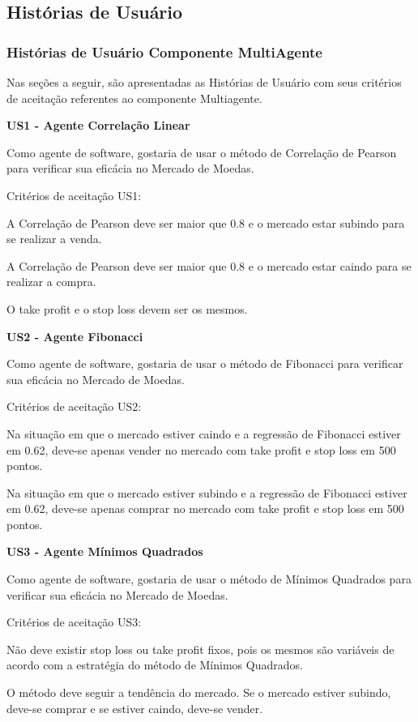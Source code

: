 \subsection{Histórias de Usuário}

\subsubsection{Histórias de Usuário Componente MultiAgente}
Nas seções a seguir, são apresentadas as Histórias de Usuário com seus critérios de aceitação referentes ao componente Multiagente.

\textbf{ US1 - Agente Correlação Linear}

Como agente de software, gostaria de usar o método de Correlação de Pearson para verificar sua eficácia no Mercado de Moedas.

Critérios de aceitação US1:

A Correlação de Pearson deve ser maior que 0.8 e o mercado estar subindo para se realizar a venda.

A Correlação de Pearson deve ser maior que 0.8 e o mercado estar caindo para se realizar a compra.

O take profit e o stop loss devem ser os mesmos.

\textbf{US2 - Agente Fibonacci}

Como agente de software, gostaria de usar o método de Fibonacci para verificar sua eficácia no Mercado de Moedas.

Critérios de aceitação US2:

Na situação em que o mercado estiver caindo e a regressão de Fibonacci estiver em 0.62, deve-se apenas vender no mercado com take profit e stop loss em 500 pontos.

Na situação em que o mercado estiver subindo e a regressão de Fibonacci estiver em 0.62, deve-se apenas comprar no mercado com take profit e stop loss em 500 pontos.

\textbf{US3 - Agente Mínimos Quadrados}

Como agente de software, gostaria de usar o método de Mínimos Quadrados para verificar sua eficácia no Mercado de Moedas.

Critérios de aceitação US3:

Não deve existir stop loss ou take profit fixos, pois os mesmos são variáveis de acordo com a estratégia do método de Mínimos Quadrados.

O método deve seguir a tendência do mercado. Se o mercado estiver subindo, deve-se comprar e se estiver caindo, deve-se vender.

